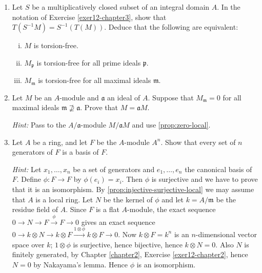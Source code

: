 \begin{enumerate}
\begin{enumerate}[i)]
        \textit{Hint:} For iv), show that $K$ may be regarded as the direct limit of its submodules $Ag$ ($g \in K$); using Chapter \ref{chapter1}, Exercise \ref{exer15-chapter1} and Exercise \ref{exer20-chapter1}, show that if $1 \otimes x = 0$ in $K \otimes M$ then $1 \otimes x = 0$ in $Ag \otimes M$ for some $g \neq 0$. Deduce that $g^{-1}x = 0$.
    \end{enumerate}

    \item \label{exer13-chapter3} Let $S$ be a multiplicatively closed subset of an integral domain $A$. In the notation of Exercise \ref{exer12-chapter3}, show that $T(S^{-1}M) = S^{-1}(T(M))$. Deduce that the following are equivalent:
    \begin{enumerate}[i)]
        \item $M$ is torsion-free.
        \item $M_{\mathfrak{p}}$ is torsion-free for all prime ideals $\mathfrak{p}$.
        \item $M_{\mathfrak{m}}$ is torsion-free for all maximal ideals $\mathfrak{m}$.
    \end{enumerate}

    \item \label{exer14-chapter3} Let $M$ be an $A$-module and $\mathfrak{a}$ an ideal of $A$. Suppose that $M_{\mathfrak{m}} = 0$ for all maximal ideals $\mathfrak{m} \not\supseteq \mathfrak{a}$. Prove that $M = \mathfrak{a}M$.
    
    \textit{Hint:} Pass to the $A/\mathfrak{a}$-module $M/\mathfrak{a}M$ and use \eqref{prop:zero-local}.

    \item \label{exer15-chapter3}Let $A$ be a ring, and let $F$ be the $A$-module $A^n$. Show that every set of $n$ generators of $F$ is a basis of $F$.
    
    \textit{Hint:} Let $x_1, \ldots, x_n$ be a set of generators and $e_1, \ldots, e_n$ the canonical basis of $F$. Define $\phi \colon F \to F$ by $\phi(e_i) = x_i$. Then $\phi$ is surjective and we have to prove that it is an isomorphism. By \eqref{prop:injective-surjective-local} we may assume that $A$ is a local ring. Let $N$ be the kernel of $\phi$ and let $k = A/\mathfrak{m}$ be the residue field of $A$. Since $F$ is a flat $A$-module, the exact sequence $0 \to N \to F \xrightarrow{\phi} F \to 0$ gives an exact sequence $0 \longrightarrow k \otimes N \longrightarrow k \otimes F \xrightarrow{1 \otimes \phi} k \otimes F \longrightarrow 0$. Now $k \otimes F = k^n$ is an $n$-dimensional vector space over $k$; $1 \otimes \phi$ is surjective, hence bijective, hence $k \otimes N = 0$. Also $N$ is finitely generated, by Chapter \ref{chapter2}, Exercise \ref{exer12-chapter2}, hence $N = 0$ by Nakayama's lemma. Hence $\phi$ is an isomorphism.


\end{enumerate}
